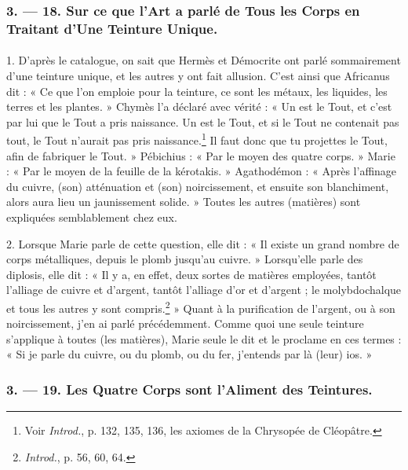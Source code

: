 \documentclass[a4paper, 11pt, oneside, polutonikogreek, french]{article}
\begin{document}
\bigskip
\centerline{\EightStarTaper}
\centerline{\EightStarTaper\EightStarTaper}
\bigskip

\subsubsection{3. --- 18. Sur ce que l'Art a parlé de Tous les Corps en Traitant d'Une Teinture Unique.}
\paragraph{}
1. D'après le catalogue, on sait que Hermès et Démocrite ont parlé sommairement d'une teinture unique, et les autres y ont fait allusion. C'est ainsi que Africanus dit : « Ce que l'on emploie pour la teinture, ce sont les métaux, les liquides, les terres et les plantes. » Chymès l'a déclaré avec vérité : « Un est le Tout, et c'est par lui que le Tout a pris naissance. Un est le Tout, et si le Tout ne contenait pas tout, le Tout n'aurait pas pris naissance.\footnote{Voir \emph{Introd.}, p. 132, 135, 136, les axiomes de la Chrysopée de Cléopâtre.} Il faut donc que tu projettes le Tout, afin de fabriquer le Tout. » Pébichius : « Par le moyen des quatre corps. » Marie : « Par le moyen de la feuille de la kérotakis. » Agathodémon : « Après l'affinage du cuivre, (son) atténuation et (son) noircissement, et ensuite son blanchiment, alors aura lieu un jaunissement solide. » Toutes les autres (matières) sont expliquées semblablement chez eux.

2. Lorsque Marie parle de cette question, elle dit : « Il existe un grand nombre de corps métalliques, depuis le plomb jusqu'au cuivre. » Lorsqu'elle parle des diplosis, elle dit : « Il y a, en effet, deux sortes de matières employées, tantôt l'alliage de cuivre et d'argent, tantôt l'alliage d'or et d'argent ; le molybdochalque et tous les autres y sont compris.\footnote{\emph{Introd.}, p. 56, 60, 64.} » Quant à la purification de l'argent, ou à son noircissement, j'en ai parlé précédemment. Comme quoi une seule teinture s'applique à toutes (les matières), Marie seule le dit et le proclame en ces termes : « Si je parle du cuivre, ou du plomb, ou du fer, j'entends par là (leur) ios. »

\bigskip
\centerline{\EightStarTaper}
\centerline{\EightStarTaper\EightStarTaper}
\bigskip

\subsubsection{3. --- 19. Les Quatre Corps sont l'Aliment des Teintures.}
\end{document}
